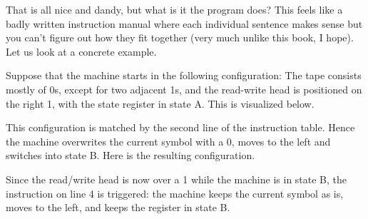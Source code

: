 \begin{examplebox}
    That is all nice and dandy, but what is it the program does?
    This feels like a badly written instruction manual where each individual sentence makes sense but you can't figure out how they fit together (very much unlike this book, I hope).
    Let us look at a concrete example.

    Suppose that the machine starts in the following configuration: 
    The tape consists mostly of 0s, except for two adjacent 1s, and the read-write head is positioned on the right 1, with the state register in state A.
    This is visualized below.
    \begin{center}
    \end{center}
    This configuration is matched by the second line of the instruction table.
    Hence the machine overwrites the current symbol with a 0, moves to the left and switches into state B\@.
    Here is the resulting configuration.
    \begin{center}
    \end{center}
    Since the read/write head is now over a 1 while the machine is in state B, the instruction on line 4 is triggered: the machine keeps the current symbol as is, moves to the left, and keeps the register in state B\@.
    \begin{center}
\end{center}
\end{examplebox}
